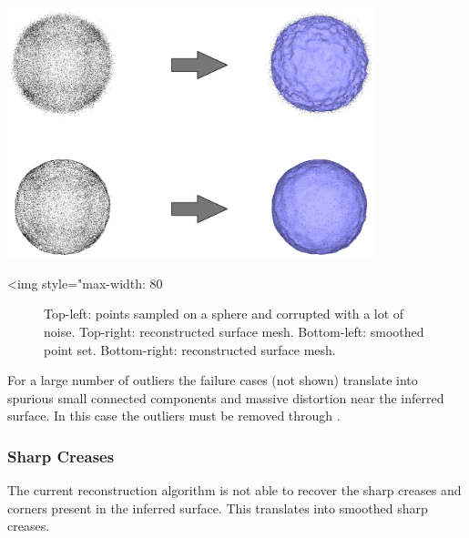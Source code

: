 \begin{center}
    \begin{ccTexOnly}
        \includegraphics[width=0.8\textwidth]{Surface_reconstruction_points_3/noise}
    \end{ccTexOnly}
    \begin{ccHtmlOnly}
        <img style="max-width: 80%
    \end{ccHtmlOnly}
    \begin{figure}[h]
        \caption{Top-left: points sampled on a sphere and corrupted with a
                 lot of noise.
                 Top-right: reconstructed surface mesh.
                 Bottom-left: smoothed point set.
                 Bottom-right: reconstructed surface mesh.}
        \label{Surface_reconstruction_points_3-fig-noise}
    \end{figure}
\end{center}

For a large number of outliers the failure cases (not shown) translate into spurious small connected components and massive distortion near the inferred surface. In this case the outliers must be removed through .


\subsubsection{Sharp Creases}

The current reconstruction algorithm is not able to recover the sharp creases and corners present in the inferred surface. This translates into smoothed sharp creases.

